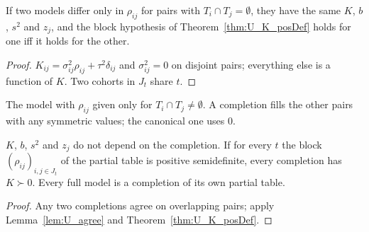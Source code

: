 \begin{lemma}\label{lem:U_agree}
  \leanok
  If two models differ only in $\rho_{ij}$ for pairs with $T_i \cap T_j = \emptyset$,
  they have the same $K$, $b$, $s^2$ and $z_j$, and the block hypothesis of
  Theorem~\ref{thm:U_K_posDef} holds for one iff it holds for the other.
\end{lemma}
\begin{proof}
  \leanok
  $K_{ij} = \sigma^2_{ij}\rho_{ij} + \tau^2\delta_{ij}$ and $\sigma^2_{ij} = 0$
  on disjoint pairs; everything else is a function of $K$. Two cohorts in
  $J_t$ share $t$.
\end{proof}

\begin{definition}\label{def:PartialCorr}
  \leanok
  The model with $\rho_{ij}$ given only for $T_i \cap T_j \neq \emptyset$.
  A completion fills the other pairs with any symmetric values; the canonical
  one uses $0$.
\end{definition}

\begin{theorem}\label{thm:U_partial}
  \leanok
  $K$, $b$, $s^2$ and $z_j$ do not depend on the completion. If for every $t$
  the block $(\rho_{ij})_{i,j\in J_t}$ of the partial table is positive
  semidefinite, every completion has $K \succ 0$. Every full model is a
  completion of its own partial table.
\end{theorem}
\begin{proof}
  \leanok
  Any two completions agree on overlapping pairs; apply Lemma~\ref{lem:U_agree}
  and Theorem~\ref{thm:U_K_posDef}.
\end{proof}

